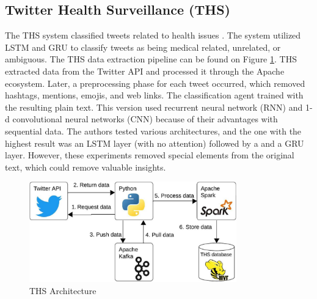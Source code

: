 \subsection{Twitter Health Surveillance (THS)}
The THS system classified tweets related to health issues \cite{8622504,9581175}. The system utilized LSTM and GRU to classify tweets as being medical related, unrelated, or ambiguous.  The THS
data extraction pipeline can be found on Figure \ref{ths_architecture}. THS extracted data from the Twitter API and processed it through the Apache ecosystem. Later, a preprocessing phase
for each tweet occurred, which removed hashtags, mentions, emojis, and web links. The classification agent trained with the resulting plain text. This version used recurrent neural network (RNN) and
1-d convolutional neural networks (CNN) because of their advantages with sequential data. The authors tested various  architectures, and the one with the highest result was an LSTM layer (with no attention) followed by a
and a GRU layer.  
However, these experiments removed special elements from the original text, which could remove valuable insights. 
 
  \begin{figure}[!h]
    \centering
        \includegraphics[width=0.8\textwidth]{figures/ths_architecture.jpeg}
        \caption{THS Architecture}
        \label{ths_architecture}
\end{figure}


